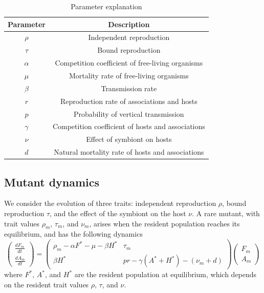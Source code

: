 \documentclass[11pt]{article}
\begin{document}
\begin{table}[ht!]
	\centering
	\begin{tabular}{c| c}
		\hline
		Parameter & Description \\
		\hline
		$\rho$ & Independent reproduction \\
		\hline 
		$\tau$ & Bound reproduction \\
		\hline
		$\alpha$ & Competition coefficient of free-living organisms \\
		\hline
		$\mu$ & Mortality rate of free-living organisms \\
		\hline
		$\beta$  & Transmission rate \\
		\hline
		$r$ & Reproduction rate of associations and hosts \\
		\hline
		$p$ & Probability of vertical transmission \\
		\hline
		$\gamma$ & Competition coefficient of hosts and associations \\
		\hline
		$\nu$ & Effect of symbiont on hosts \\
		\hline
		$d$ & Natural mortality rate of hosts and associations \\
		\hline
	\end{tabular}
	\caption{Parameter explanation}
	\label{table:parameters}
\end{table}

\subsection*{Mutant dynamics}
We consider the evolution of three traits: independent reproduction $\rho$, bound reproduction $\tau$, and the effect of the symbiont on the host $\nu$. A rare mutant, with trait values $\rho_m$, $\tau_m$, and $\nu_m$, arises when the resident population reaches its equilibrium, and has the following dynamics
\begin{equation}
	\begin{pmatrix}
		\frac{d F_m}{dt} \\
		\frac{d A_m}{dt}
	\end{pmatrix}
	=
	\begin{pmatrix}
		\rho_m - \alpha F^* - \mu - \beta H^* & \tau_m \\
		\beta H^* & p r - \gamma(A^* + H^*) - (\nu_m + d)
	\end{pmatrix}
	  \begin{pmatrix}
	  	F_m \\ A_m
	  \end{pmatrix}
	  \label{eq:mutant_dyn}
\end{equation}
where $F^*$, $A^*$, and $H^*$ are the resident population at equilibrium, which depends on the resident trait values $\rho$, $\tau$, and $\nu$. 
\end{document}
